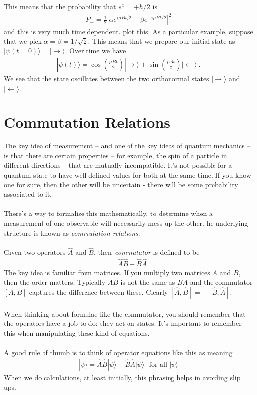 \documentclass[12pt]{article}
\def\be{\begin{eqnarray}}
\def\ee{\end{eqnarray}}
\newcommand{\nn}{\nonumber}
\newcommand\para{\paragraph{}}
\newcommand{\ket}[1]{|#1\rangle}
\newcommand{\co}{\color{olive}}
\newcommand{\cblue}{\color{blue}}
\newcommand{\rightket}{|\rightarrow\rangle}
\newcommand{\leftket}{|\leftarrow\rangle}
\begin{document}
{{This means that the probability that $s^x=+\hbar/2$ is 
%
\be P_+ = \frac{1}{2}\left|\alpha e^{i\mu B t/2} + \beta e^{-i\mu B t/2}\right|^2\nn\ee
%
and this is very much time dependent.} {\cblue plot this.} {\co As a particular example, suppose that we pick $\alpha = \beta = 1/\sqrt{2}$. This means that we prepare our initial  state as $\ket{\psi(t=0)}=\rightket$. Over time we have
%
\be \ket{\psi(t)} = \cos \left(\frac{\mu Bt}{2}\right)\rightket + \sin\left(\frac{\mu Bt}{2}\right)\leftket\ .\label{zenoround}\ee
%
We see that the state oscillates between the two orthonormal states $\rightket$ and $\leftket$.} 






\newpage
\section{Commutation Relations}

The key idea of measurement -- and one of the key ideas of quantum mechanics -- is that there are certain properties -- for example, the spin of a particle in different directions -- that are mutually incompatible. It's not possible for a quantum state to have well-defined values for both at the same time. If you know one for sure, then the other will be uncertain - there will be some probability associated to it. 


\para
There's a way to formalise this mathematically, to determine when a measurement of one observable will necessarily mess up the other. he underlying structure is known as {\it commutation relations}.

\para
{\co 
Given two operators $\hat{A}$ and $\hat{B}$, their {\it commutator} is defined to be
%
\be [\hat{A},\hat{B}] = \hat{A}\hat{B} - \hat{B}\hat{A}\ \nn\ee
%
}
The key idea is familiar from matrices. If you multiply two matrices $A$ and $B$, then the order matters. Typically $AB$ is not the same as $BA$ and the commutator $[A,B]$ captures the difference between these.  {\co Clearly    $[\hat{A},\hat{B}]=- [\hat{B},\hat{A}]$.}

\para
When thinking about formulae like the commutator, you should remember that  the operators have a job to do: they act on states. It's important to remember this when manipulating these kind of equations.

\para
{\co A good rule of thumb is to think of operator equations  like this as meaning
%
\be [\hat{A},\hat{B}]\ket{\psi} = \hat{A}\hat{B}\ket{\psi} - \hat{B}\hat{A} \ket{\psi}\ \ \ \mbox{for all $\ket{\psi}$}\nn\ee
%
When we do calculations, at least initially,  this phrasing helps in  avoiding slip ups.}

}
\end{document}
